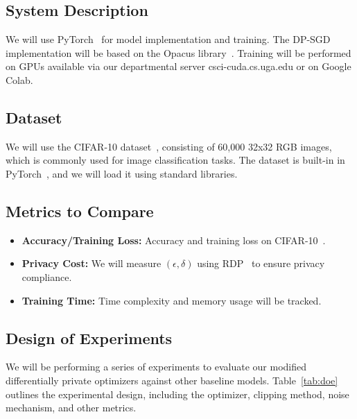 \subsection{System Description}\label{subsec:system-description}
We will use PyTorch~\cite{pytorch_2019} for model implementation and training.
The DP-SGD~\cite{Abadi_2016_DeepLearningDifferentialPrivacy} implementation will be based on the Opacus library~\cite{opacus}.
Training will be performed on GPUs available via our departmental server csci-cuda.cs.uga.edu or on Google Colab.

\subsection{Dataset}\label{subsec:dataset}
We will use the CIFAR-10 dataset~\cite{cifar10_dataset}, consisting of 60,000 32x32 RGB images, which is commonly used for
image classification tasks.
The dataset is built-in in PyTorch~\cite{pytorch_2019}, and we will load it using standard libraries.

\subsection{Metrics to Compare}\label{subsec:metrics}
\begin{itemize}
    \item \textbf{Accuracy/Training Loss:} Accuracy and training loss on CIFAR-10~\cite{cifar10_dataset}.
    \item \textbf{Privacy Cost:} We will measure $(\epsilon, \delta)$ using RDP~\cite{Mironov_2017_RenyiDP} to ensure privacy compliance.
    \item \textbf{Training Time:} Time complexity and memory usage will be tracked.
\end{itemize}

\subsection{Design of Experiments}\label{subsec:design-of-experiments}
We will be performing a series of experiments to evaluate our modified differentially private optimizers against other baseline models.
Table~\ref{tab:doe} outlines the experimental design, including the optimizer, clipping method, noise mechanism, and other metrics.

